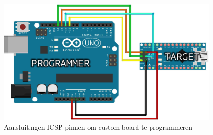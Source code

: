 \begin{figure}[H]
	\centering
	\includegraphics[width=\textwidth]{arduinoisp.png}
	\caption{Aansluitingen ICSP-pinnen om custom board te programmeren\label{fig:arduinoisp}}
\end{figure}
